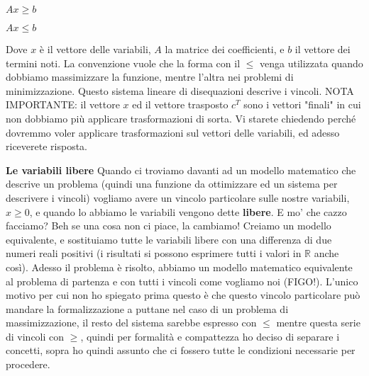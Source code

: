 \documentclass{article}
\begin{document}
    \begin{center}
        $Ax \ge b$
        
        $Ax \le b$
    \end{center}
    Dove $x$ è il vettore delle variabili, $A$ la matrice dei coefficienti, e $b$ il vettore dei termini noti. La convenzione vuole che la forma con il $\le$ venga utilizzata quando dobbiamo massimizzare la funzione, mentre l'altra nei problemi di minimizzazione. Questo sistema lineare di disequazioni descrive i vincoli.\newline
    NOTA IMPORTANTE: il vettore $x$ ed il vettore trasposto $c^T$ sono i vettori "finali" in cui non dobbiamo più applicare trasformazioni di sorta. Vi starete chiedendo perché dovremmo voler applicare trasformazioni sul vettori delle variabili, ed adesso riceverete risposta.

    \textbf{Le variabili libere}\newline
    Quando ci troviamo davanti ad un modello matematico che descrive un problema (quindi una funzione da ottimizzare ed un sistema per descrivere i vincoli) vogliamo avere un vincolo particolare sulle nostre variabili, $x \ge 0$, e quando lo abbiamo le variabili vengono dette \textbf{libere}.\newline
    E mo' che cazzo facciamo? Beh se una cosa non ci piace, la cambiamo! Creiamo un modello equivalente, e sostituiamo tutte le variabili libere con una differenza di due numeri reali positivi (i risultati si possono esprimere tutti i valori in $\mathbb{R}$ anche così). Adesso il problema è risolto, abbiamo un modello matematico equivalente al problema di partenza e con tutti i vincoli come vogliamo noi (FIGO!). L'unico motivo per cui non ho spiegato prima questo è che questo vincolo particolare può mandare la formalizzazione a puttane nel caso di un problema di massimizzazione, il resto del sistema sarebbe espresso con $\le$ mentre questa serie di vincoli con $\ge$, quindi per formalità e compattezza ho deciso di separare i concetti, sopra ho quindi assunto che ci fossero tutte le condizioni necessarie per procedere.
\end{document}
